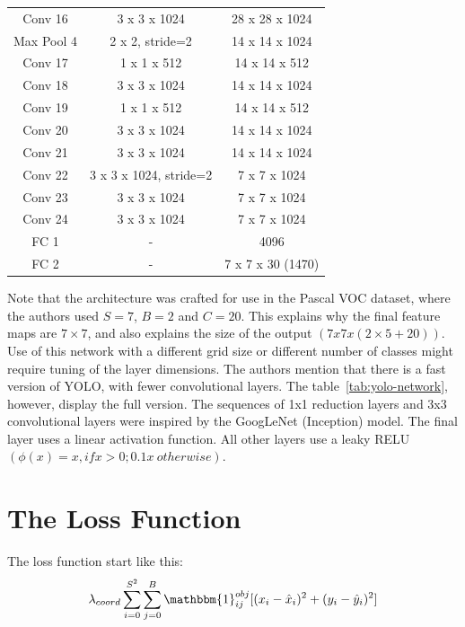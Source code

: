 \begin{table}[!h]
{\begin{tabular}{c c c}
      Conv 16    & 3 x 3 x 1024           & 28 x 28 x 1024    \\
      Max Pool 4 & 2 x 2, stride=2        & 14 x 14 x 1024    \\
      Conv 17    & 1 x 1 x 512            & 14 x 14 x 512     \\
      Conv 18    & 3 x 3 x 1024           & 14 x 14 x 1024    \\
      Conv 19    & 1 x 1 x 512            & 14 x 14 x 512     \\
      Conv 20    & 3 x 3 x 1024           & 14 x 14 x 1024    \\
      Conv 21    & 3 x 3 x 1024           & 14 x 14 x 1024    \\
      Conv 22    & 3 x 3 x 1024, stride=2 & 7 x 7 x 1024      \\
      Conv 23    & 3 x 3 x 1024           & 7 x 7 x 1024      \\
      Conv 24    & 3 x 3 x 1024           & 7 x 7 x 1024      \\
      FC 1       & -                      & 4096              \\
      FC 2       & -                      & 7 x 7 x 30 (1470) \\
\bottomrule
    \end{tabular}
  }
\end{table}

Note that the architecture was crafted for use in the Pascal VOC dataset, where the authors used $S=7$, $B=2$ and $C=20$. This explains why the final feature maps are $7 \times 7$, and also explains the size of the output $(7x7x(2 \times 5+20))$. Use of this network with a different grid size or different number of classes might require tuning of the layer dimensions. The authors mention that there is a fast version of YOLO, with fewer convolutional layers. The table~\ref{tab:yolo-network}, however, display the full version. The sequences of 1x1 reduction layers and 3x3 convolutional layers were inspired by the GoogLeNet (Inception) model. The final layer uses a linear activation function. All other layers use a leaky RELU $(\phi(x) = x, if x>0; 0.1x \ otherwise)$.

\section{The Loss Function}
The loss function start like this:
\begin{equation}
  \lambda_{coord} \sum_{i=0}^{S^2}\sum_{j=0}^B \mathbbm{1}_{ij}^{obj}[(x_i-\hat{x}_i)^2 + (y_i-\hat{y}_i)^2 ]
\label{yolo-loss-func}
\end{equation}


